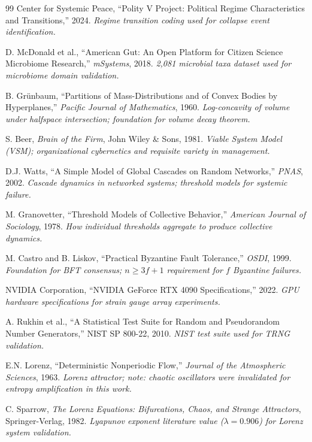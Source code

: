 \documentclass[11pt,a4paper]{article}
\theoremstyle{definition}
\theoremstyle{remark}
\begin{document}
\begin{thebibliography}{99}
Center for Systemic Peace, ``Polity V Project: Political Regime Characteristics and Transitions,'' 2024.
\textit{Regime transition coding used for collapse event identification.}

D. McDonald et al., ``American Gut: An Open Platform for Citizen Science Microbiome Research,'' \textit{mSystems}, 2018.
\textit{2,081 microbial taxa dataset used for microbiome domain validation.}

B. Gr\"unbaum, ``Partitions of Mass-Distributions and of Convex Bodies by Hyperplanes,'' \textit{Pacific Journal of Mathematics}, 1960.
\textit{Log-concavity of volume under halfspace intersection; foundation for volume decay theorem.}

S. Beer, \textit{Brain of the Firm}, John Wiley \& Sons, 1981.
\textit{Viable System Model (VSM); organizational cybernetics and requisite variety in management.}

D.J. Watts, ``A Simple Model of Global Cascades on Random Networks,'' \textit{PNAS}, 2002.
\textit{Cascade dynamics in networked systems; threshold models for systemic failure.}

M. Granovetter, ``Threshold Models of Collective Behavior,'' \textit{American Journal of Sociology}, 1978.
\textit{How individual thresholds aggregate to produce collective dynamics.}

M. Castro and B. Liskov, ``Practical Byzantine Fault Tolerance,'' \textit{OSDI}, 1999.
\textit{Foundation for BFT consensus; $n \geq 3f+1$ requirement for $f$ Byzantine failures.}

NVIDIA Corporation, ``NVIDIA GeForce RTX 4090 Specifications,'' 2022.
\textit{GPU hardware specifications for strain gauge array experiments.}

A. Rukhin et al., ``A Statistical Test Suite for Random and Pseudorandom Number Generators,'' NIST SP 800-22, 2010.
\textit{NIST test suite used for TRNG validation.}

E.N. Lorenz, ``Deterministic Nonperiodic Flow,'' \textit{Journal of the Atmospheric Sciences}, 1963.
\textit{Lorenz attractor; note: chaotic oscillators were invalidated for entropy amplification in this work.}

C. Sparrow, \textit{The Lorenz Equations: Bifurcations, Chaos, and Strange Attractors}, Springer-Verlag, 1982.
\textit{Lyapunov exponent literature value ($\lambda = 0.906$) for Lorenz system validation.}


\end{thebibliography}
\end{document}
